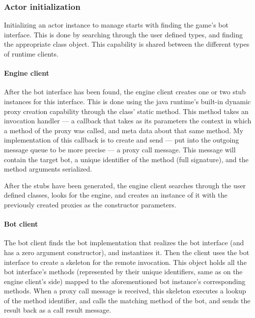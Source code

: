 		\subsubsection*{Actor initialization}
		
		Initializing an actor instance to manage starts with finding the game's bot interface. This is done by searching through the user defined types, and finding the appropriate class object. This capability is shared between the different types of runtime clients.
		
			\paragraph{Engine client}
		
			After the bot interface has been found, the engine client creates one or two stub instances for this interface. This is done using the java runtime's built-in dynamic proxy creation capability through the  class' static  method. This method takes an invocation handler --- a callback that takes as its parameters the context in which a method of the proxy was called, and meta data about that same method. My implementation of this callback is to create and send --- put into the outgoing message queue to be more precise --- a proxy call message. This message will contain the target bot, a unique identifier of the method (full signature), and the method arguments serialized.
			
			After the stubs have been generated, the engine client searches through the user defined classes, looks for the engine, and creates an instance of it with the previously created proxies as the constructor parameters.
			
			\paragraph{Bot client}
			
			The bot client finds the bot implementation that realizes the bot interface (and has a zero argument constructor), and instantizes it. Then the client uses the bot interface to create a skeleton for the remote invocation. This object holds all the bot interface's methods (represented by their unique identifiers, same as on the engine client's side) mapped to the aforementioned bot instance's corresponding methods. When a proxy call message is received, this skeleton executes a lookup of the method identifier, and calls the matching method of the bot, and sends the result back as a call result message. 
			
%






